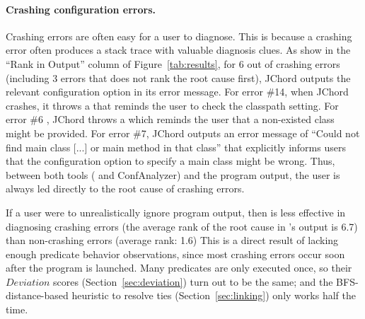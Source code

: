 
\paragraph{Crashing configuration errors.}

Crashing errors are often easy for a user to diagnose.
This is because a crashing error often produces a stack trace with valuable diagnosis clues.
 As show in the ``Rank in Output''
column of Figure~\ref{tab:results}, for 6 out of \crash crashing errors
(including 3 errors that \ourtool does not rank the root cause first),
JChord outputs the relevant configuration option in its error message.
For error \#14, when JChord crashes, it throws a 
that reminds the user to check the classpath setting.  
For error \#6 , JChord throws a 
which reminds the user that a non-existed class might be provided.
For error \#7, JChord outputs an error message of ``Could not find main class [...]
or main method in that class'' that explicitly informs users that
the configuration option to specify a main class might be wrong.
Thus, between both tools (\ourtool
and ConfAnalyzer) and the program output, the user is always
led directly to the root cause of crashing errors.



If a user were to unrealistically ignore program output, then \ourtool is less effective
in diagnosing crashing errors (the average rank of the root cause
in \ourtool's output is 6.7) than non-crashing errors (average rank: 1.6)
This is a direct result of lacking enough predicate behavior observations,
since most crashing errors occur soon
after the program is launched.  Many predicates are
only executed once, so their $Deviation$ scores
 (Section~\ref{sec:deviation}) turn out to be the same; and the
 BFS-distance-based heuristic to resolve ties (Section~\ref{sec:linking}) only
works half the time.



